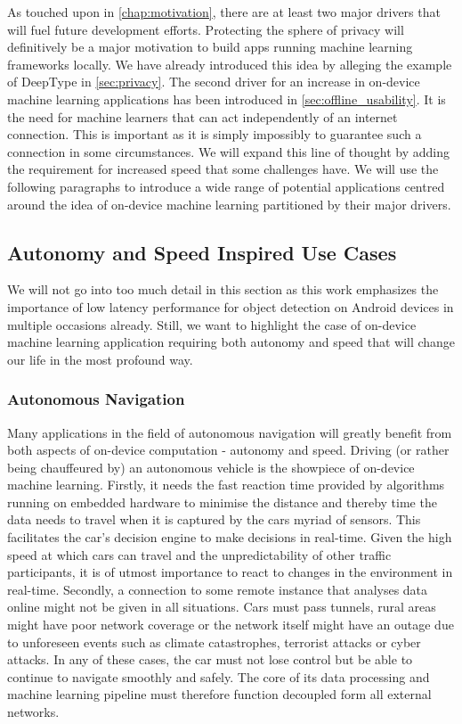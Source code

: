 \documentclass[
			   fontsize=11pt,
               paper=a4,
               bibliography=totoc,
               idxtotoc,
               headsepline,
               footsepline,
               footinclude=false,
               BCOR=12mm,
               DIV=13,
               openany,   %
               ]
               {scrbook}
\begin{document}
As touched upon in \autoref{chap:motivation}, there are at least two major drivers that will fuel future development efforts. Protecting the sphere of privacy will definitively be a major motivation to build apps running machine learning frameworks locally. We have already introduced this idea by alleging the example of DeepType in \autoref{sec:privacy}. The second driver for an increase in on-device machine learning applications has been introduced in \autoref{sec:offline_usability}. It is the need for machine learners that can act independently of an internet connection. This is important as it is simply impossibly to guarantee such a connection in some circumstances. We will expand this line of thought by adding the requirement for increased speed that some challenges have. We will use the following paragraphs to introduce a wide range of potential applications centred around the idea of on-device machine learning partitioned by their major drivers.

\subsection{Autonomy and Speed Inspired Use Cases}

We will not go into too much detail in this section as this work emphasizes the importance of low latency performance for object detection on Android devices in multiple occasions already. Still, we want to highlight the case of on-device machine learning application requiring both autonomy and speed that will change our life in the most profound way.

\subsubsection{Autonomous Navigation}
Many applications in the field of autonomous navigation will greatly benefit from both aspects of on-device computation - autonomy and speed. Driving (or rather being chauffeured by) an autonomous vehicle is the showpiece of on-device machine learning. Firstly, it needs the fast reaction time provided by algorithms running on embedded hardware to minimise the distance and thereby time the data needs to travel when it is captured by the cars myriad of sensors. This facilitates the car's decision engine to make decisions in real-time. Given the high speed at which cars can travel and the unpredictability of other traffic participants, it is of utmost importance to react to changes in the environment in real-time. Secondly, a connection to some remote instance that analyses data online might not be given in all situations. Cars must pass tunnels, rural areas might have poor network coverage or the network itself might have an outage due to unforeseen events such as climate catastrophes, terrorist attacks or cyber attacks. In any of these cases, the car must not lose control but be able to continue to navigate smoothly and safely. The core of its data processing and machine learning pipeline must therefore function decoupled form all external networks. \\
\end{document}
